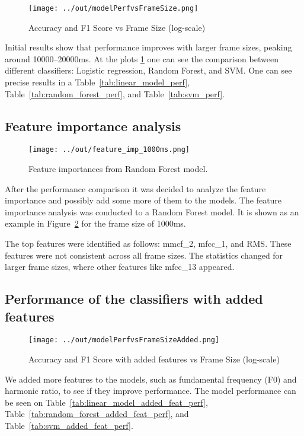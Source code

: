 \documentclass[conference]{IEEEtran}
\begin{document}
\begin{figure}[h]
    \centering
    \texttt{[image: ../out/modelPerfvsFrameSize.png]}
    \caption{Accuracy and F1 Score vs Frame Size (log-scale)}
    \label{fig:model_perf}
\end{figure}

Initial results show that performance improves with larger frame sizes, peaking around 10000–20000ms.
At the plots \ref{fig:model_perf} one can see the comparison between different classifiers: Logistic regression, Random Forest, and SVM.
One can see precise results in a Table~\ref{tab:linear_model_perf}, Table~\ref{tab:random_forest_perf}, and Table~\ref{tab:svm_perf}.

\subsection{Feature importance analysis}

\begin{figure}[h]
    \centering
    \texttt{[image: ../out/feature\_imp\_1000ms.png]}
    \caption{Feature importances from Random Forest model.}
    \label{fig:feature_importance}
\end{figure}

After the performance comparison it was decided to analyze the feature importance and possibly add some more of them to the models.
The feature importance analysis was conducted to a Random Forest model. 
It is shown as an example in Figure~\ref{fig:feature_importance} for the frame size of 1000ms.

The top features were identified as follows: mmcf\_2, mfcc\_1, and RMS. 
These features were not consistent across all frame sizes. 
The statistics changed for larger frame sizes, where other features like mfcc\_13 appeared.

\subsection{Performance of the classifiers with added features}

\begin{figure}[h]
    \centering
    \texttt{[image: ../out/modelPerfvsFrameSizeAdded.png]}
    \caption{Accuracy and F1 Score with added features vs Frame Size (log-scale)}
    \label{fig:model_perf_added}
\end{figure}

We added more features to the models, such as fundamental frequency (F0) and harmonic ratio, to see if they improve performance.
The model performance can be seen on Table~\ref{tab:linear_model_added_feat_perf}, Table~\ref{tab:random_forest_added_feat_perf}, and Table~\ref{tab:svm_added_feat_perf}.
\end{document}
